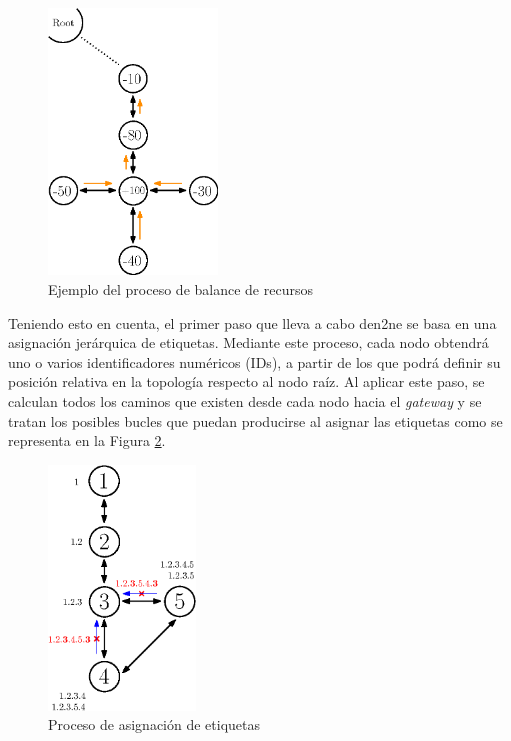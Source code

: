 \vspace{3mm}

\begin{figure}[H]
  \centering
  \includegraphics[width=0.4\textwidth]{img/teoria/fig2.eps}
  \caption{Ejemplo del proceso de balance de recursos \cite{den2ne}}
  \label{fig:balance}
\end{figure}

\vspace{3mm}

Teniendo esto en cuenta, el primer paso que lleva a cabo \gls{den2ne} se basa en una asignación jerárquica de etiquetas. Mediante este proceso, cada nodo obtendrá uno o varios identificadores numéricos (IDs), a partir de los que podrá definir su posición relativa en la topología respecto al nodo raíz. Al aplicar este paso, se calculan todos los caminos que existen desde cada nodo hacia el \textit{gateway} y se tratan los posibles bucles que puedan producirse al asignar las etiquetas como se representa en la Figura \ref{fig:bucle}.

\vspace{3mm}

\begin{figure}[h!]
  \centering
  \includegraphics[width=0.35\textwidth]{img/teoria/fig4.eps}
  \caption{Proceso de asignación de etiquetas \cite{den2ne}}
  \label{fig:bucle}
\end{figure}

